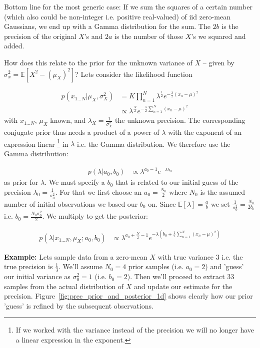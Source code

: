 Bottom line for the most generic case: If we sum the squares of a
certain number (which also could be non-integer i.e. positive real-valued)
of iid zero-mean Gaussians, we end up with a Gamma distribution for
the sum. The $2b$ is the precision of the original $X$'s and $2a$
is the number of those $X$'s we squared and added.

How does this relate to the prior for the unknown variance of $X$
-- given by $\sigma_{x}^{2}=\mathbb{E}[X^{2}-(\mu_{X})^{2}]$? Lets
consider the likelihood function

\begin{align*}
p(x_{1\ldots N}|\mu_{X},\sigma_{X}^{2}) & =K\prod_{n=1}^{N}\lambda^{\frac{1}{2}}e^{-\frac{\lambda}{2}(x_{n}-\mu)^{2}}\\
 & \propto\lambda^{\frac{N}{2}}e^{-\frac{\lambda}{2}\sum_{n=1}^{N}(x_{n}-\mu)^{2}}
\end{align*}
with $x_{1\ldots N}$, $\mu_{X}$ known, and $\lambda_{X}=\frac{1}{\sigma_{X}^{2}}$
the unknown precision. The corresponding conjugate prior thus needs
a product of a power of $\lambda$ with the exponent of an expression
linear%
\footnote{If we worked with the variance instead of the precision we will no
longer have a linear expression in the exponent.%
} in $\lambda$ i.e. the Gamma distribution. We therefore use the Gamma
distribution:

\begin{align*}
p(\lambda|a_{0},b_{0}) & \propto\lambda^{a_{0}-1}e^{-\lambda b_{0}}
\end{align*}
 as prior for $\lambda$. We must specify a $b_{0}$ that is related
to our initial guess of the precision $\lambda_{0}=\frac{1}{\sigma_{0}^{2}}$.
For that we first choose an $a_{0}=\frac{N_{0}}{2}$ where $N_{0}$
is the assumed number of initial observations we based our $b_{0}$
on. Since $\mathbb{E}[\lambda]=\frac{a}{b}$ we set $\frac{1}{\sigma_{0}^{2}}=\frac{N_{0}}{2b_{0}}$
i.e. $b_{0}=\frac{N_{0}\sigma_{0}^{2}}{2}$. We multiply to get the
posterior:

\begin{align*}
p(\lambda|x_{1\ldots N},\mu_{X};a_{0},b_{0}) & \propto\lambda^{a_{0}+\frac{N}{2}-1}e^{-\lambda\left(b_{0}+\frac{1}{2}\sum_{n=1}^{N}(x_{n}-\mu)^{2}\right)}
\end{align*}


\textbf{Example:} Lets sample data from a zero-mean $X$ with true
variance 3 i.e. the true precision is $\frac{1}{3}$. We'll assume
$N_{0}=4$ prior samples (i.e. $a_{0}=2$) and 'guess' our initial
variance as $\sigma_{0}^{2}=1$ (i.e. $b_{0}=2)$. Then we'll proceed
to extract 33 samples from the actual distribution of $X$ and update
our estimate for the precision. Figure~\ref{fig:prec_prior_and_posterior_1d}
shows clearly how our prior 'guess' is refined by the subsequent observations.

